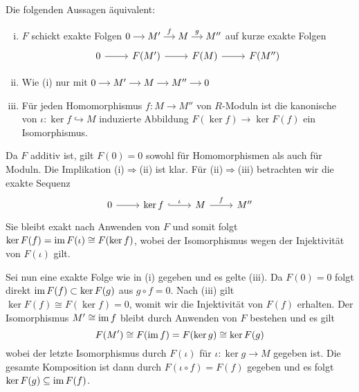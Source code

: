Die folgenden Aussagen äquivalent:
\begin{enumerate}[(i)]
	\item $F$ schickt exakte Folgen $ \begin{tikzcd}[cramped,sep=small]
		0 \rar & M' \rar["f"] & M \rar["g"] & M''
	\end{tikzcd}$ auf kurze exakte Folgen
	\[
		\begin{tikzcd}
			0 \rar & F(M') \rar & F(M) \rar & F(M'')
		\end{tikzcd}
	\]
	\item Wie (i) nur mit 
	\(
		\begin{tikzcd}[cramped,sep=small]
			0 \rar & M' \rar & M \rar & M'' \rar & 0
		\end{tikzcd}
	\)
	\item Für jeden Homomorphismus $f \colon M \to M''$ von $R$-Moduln ist die kanonische von $\iota \colon \ker f \hookrightarrow M$ induzierte Abbildung $F(\ker f) \to \ker F(f)$ ein Isomorphismus.
\end{enumerate}
\begin{beweis}
	Da $F$ additiv ist, gilt $F(0)=0$ sowohl für Homomorphismen als auch für Moduln. 
	Die Implikation (i)$\Rightarrow$(ii) ist klar.
	Für (ii)$\Rightarrow$(iii) betrachten wir die exakte Sequenz
	\[
		\begin{tikzcd}
			0 \rar & \ker f \rar[hook,"\iota"] & M \rar["f"] & M''
		\end{tikzcd}
	\]
	Sie bleibt exakt nach Anwenden von $F$ und somit folgt $\ker F(f) = \operatorname{im} F(\iota) \cong F(\ker f)$, wobei der Isomorphismus wegen der Injektivität von $F(\iota)$ gilt.
	
	Sei nun eine exakte Folge wie in (i) gegeben und es gelte (iii).
	Da $F(0)=0$ folgt direkt $\operatorname{im} F(f) \subset \ker F(g)$ aus $g \circ f =0$.
	Nach (iii) gilt $\ker F(f) \cong F(\ker f) = 0$, womit wir die Injektivität von $F(f)$ erhalten.
	Der Isomorphismus $M' \cong \operatorname{im} f$ bleibt durch Anwenden von $F$ bestehen und es gilt
	\[
		F(M') \cong F(\operatorname{im} f) = F(\ker g) \cong \ker F(g)
	\]
	wobei der letzte Isomorphismus durch $F(\iota)$ für $\iota\colon \ker g \to M$ gegeben ist.
	Die gesamte Komposition ist dann durch $F(\iota \circ f) = F(f)$ gegeben und es folgt $\ker F(g) \subseteq \operatorname{im} F(f)$.
\end{beweis}

